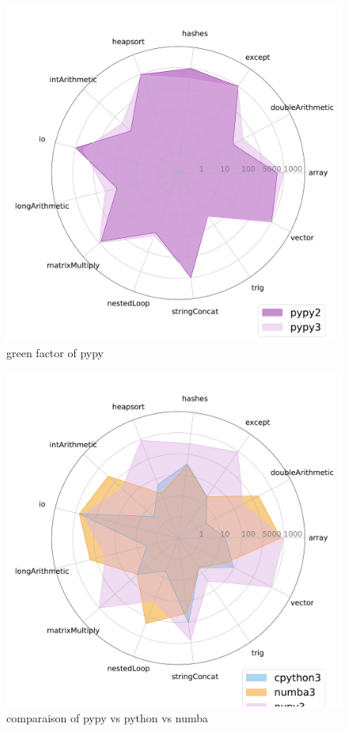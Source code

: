 \begin{figure}[thb]
    \centering
    \includegraphics[width=\linewidth]{imgs/tommti_compare__pypy2_pypy3}
    \caption{green factor of pypy }
    \label{fig:pypy2vspypy3}
\end{figure}

\begin{figure}[thb]
    \centering
    \includegraphics[width=\linewidth]{imgs/tommti_compare__cpython3_numba3_pypy3}
    \caption{comparaison of pypy vs python vs numba }
    \label{fig:p3}
\end{figure}

